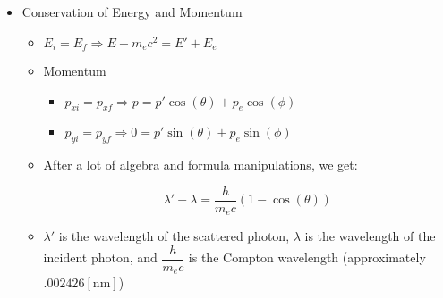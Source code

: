 \begin{itemize}
  \item Conservation of Energy and Momentum

    \begin{itemize}

      \item $E_i=E_f\Rightarrow E+m_ec^2=E'+E_e$

      \item Momentum

        \begin{itemize}

          \item $p_{xi}=p_{xf}\Rightarrow p=p'\cos(\theta)+p_e\cos(\phi)$

          \item $p_{yi}=p_{yf}\Rightarrow 0=p'\sin(\theta)+p_e\sin(\phi)$

        \end{itemize}

      \item After a lot of algebra and formula manipulations, we get:

        $$\boxed{\lambda'-\lambda=\frac{h}{m_ec}\left( 1-\cos(\theta) \right)}$$

      \item $\lambda'$ is the wavelength of the scattered photon, $\lambda$ is the wavelength of the incident photon, and $\dfrac{h}{m_ec}$ is the Compton wavelength (approximately $.002426[\si{\nano\meter}]$)

    \end{itemize}

\end{itemize}



